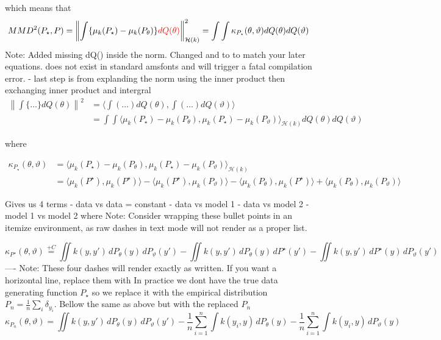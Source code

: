 \documentclass[11pt,a4paper]{article}
\newcommand{\add}[1]{{\color{red}#1}}
\begin{document}
which means that 
$$MMD^2(P_\star, P) = \left\| \int \{ \mu_k(P_\star) - \mu_k(P_\theta) \} \add{dQ(\theta)}\right\|^2_{\mathcal{H}(k)} = \int\int\kappa_{P_{\star}}(\theta, \vartheta) dQ(\theta)dQ(\vartheta)$$ \add{Note: Added missing dQ(\theta) inside the norm. Changed \mathbb{v} and \mathscr{v} to \vartheta to match your later equations. \mathbb{v} does not exist in standard amsfonts and will trigger a fatal compilation error.}
 - last step is from explanding the norm using the inner product then exchanging inner product and intergral
$$\begin{aligned}
\left\| \int \{ \dots \} dQ(\theta) \right\|^2 &= \langle \int (\dots) dQ(\theta), \int (\dots) dQ(\vartheta) \rangle \\
&= \int \int \langle \mu_k(P_\star) - \mu_k(P_\theta), \mu_k(P_\star) - \mu_k(P_{\vartheta}) \rangle_{\mathcal{H}(k)} dQ(\theta) dQ(\vartheta)
\end{aligned}
$$


where


$$
\begin{aligned}
 \kappa_{P_{\star}}(\theta, \vartheta) &= \langle \mu_k(P_\star) - \mu_k(P_\theta), \mu_k(P_\star) - \mu_k(P_{\vartheta}) \rangle_{\mathcal{H}(k)} \\
  &= \langle \mu_k(P^\star), \mu_k(P^\star) \rangle - \langle \mu_k(P^\star), \mu_k(P_\vartheta) \rangle - \langle \mu_k(P_\theta), \mu_k(P^\star) \rangle + \langle \mu_k(P_\theta), \mu_k(P_\vartheta) \rangle
\end{aligned}
$$

Gives us 4 terms  
- data vs data = constant 
- data vs model 1
- data vs model 2
- model 1 vs model 2 where \add{Note: Consider wrapping these bullet points in an itemize environment, as raw dashes in text mode will not render as a proper list.}


$$\kappa_{P^\star}(\theta, \vartheta) \stackrel{+C}{=} \iint k(y,y') \, dP_\theta(y) \, dP_\vartheta(y') - \iint k(y,y') \, dP_\theta(y) \, dP^\star(y') - \iint k(y,y') \, dP^\star(y) \, dP_\vartheta(y')$$
---- \add{Note: These four dashes will render exactly as written. If you want a horizontal line, replace them with \noindent\hrulefill}
In practice we dont have the true data generating function $P_\star$ so we replace it with the empirical distribution $P_n = \frac{1}{n}\sum_i\delta_{y_i}$. Bellow the same as above but with the replaced $P_n$
$$\kappa_{P_n}(\theta, \vartheta) = \iint k(y,y') \, dP_\theta(y) \, dP_\vartheta(y') - \frac{1}{n}\sum_{i=1}^n \int k(y_i, y) \, dP_\theta(y) - \frac{1}{n}\sum_{i=1}^n \int k(y_i, y) \, dP_\vartheta(y)$$
\end{document}
